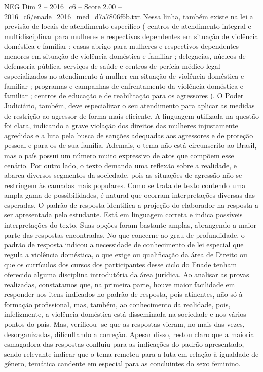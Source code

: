 \begin{textsample}{NEG Dim 2 – 2016\_c6 – Score 2.00 – 2016\_c6/enade\_2016\_med\_d7a7806f6b.txt}
Nessa linha, também existe na lei a previsão de locais de atendimento específico ( centros de atendimento integral e multidisciplinar para mulheres e respectivos dependentes em situação de violência doméstica e familiar ; casas-abrigo para mulheres e respectivos dependentes menores em situação de violência doméstica e familiar ; delegacias, núcleos de defensoria pública, serviços de saúde e centros de perícia médico-legal especializados no atendimento à mulher em situação de violência doméstica e familiar ; programas e campanhas de enfrentamento da violência doméstica e familiar ; centros de educação e de reabilitação para os agressores ).
O Poder Judiciário, também, deve especializar o seu atendimento para aplicar as medidas de restrição ao agressor de forma mais eficiente.
A linguagem utilizada na questão foi clara, indicando a grave violação dos direitos das mulheres injustamente agredidas e a luta pela busca de sanções adequadas aos agressores e de proteção pessoal e para os de sua família.
Ademais, o tema não está circunscrito ao Brasil, mas o país possui um número muito expressivo de atos que compõem esse cenário.
Por outro lado, o texto demanda uma reflexão sobre a realidade, e abarca diversos segmentos da sociedade, pois as situações de agressão não se restringem às camadas mais populares.
Como se trata de texto contendo uma ampla gama de possibilidades, é natural que ocorram interpretações diversas das esperadas.
O padrão de resposta identifica a projeção do elaborador na resposta a ser apresentada pelo estudante.
Está em linguagem correta e indica possíveis interpretações do texto.
Suas opções foram bastante amplas, abrangendo a maior parte das respostas encontradas.
No que concerne ao grau de profundidade, o padrão de resposta indicou a necessidade de conhecimento de lei especial que regula a violência doméstica, o que exige ou qualificação da área de Direito ou que os currículos dos cursos dos participantes desse ciclo do Enade tenham oferecido alguma disciplina introdutória da área jurídica.
Ao analisar as provas realizadas, constatamos que, na primeira parte, houve maior facilidade em responder aos itens indicados no padrão de resposta, pois atinentes, não só à formação profissional, mas, também, ao conhecimento da realidade, pois, infelizmente, a violência doméstica está disseminada na sociedade e nos vários pontos do país.
Mas, verificou -se que as respostas vieram, no mais das vezes, desorganizadas, dificultando a correção.
Apesar disso, restou claro que a maioria esmagadora das respostas confluiu para as indicações do padrão apresentado, sendo relevante indicar que o tema remeteu para a luta em relação à igualdade de gênero, temática candente em especial para as concluintes do sexo feminino.

\end{textsample}
